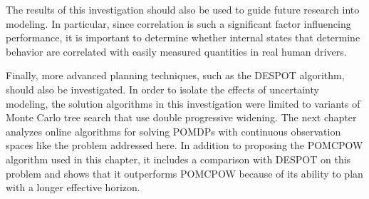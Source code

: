 The results of this investigation should also be used to guide future research into modeling.
In particular, since correlation is such a significant factor influencing performance, it is important to determine whether internal states that determine behavior are correlated with easily measured quantities in real human drivers.

Finally, more advanced planning techniques, such as the DESPOT algorithm, should also be investigated.
In order to isolate the effects of uncertainty modeling, the solution algorithms in this investigation were limited to variants of Monte Carlo tree search that use double progressive widening.
The next chapter analyzes online algorithms for solving POMDPs with continuous observation spaces like the problem addressed here.
In addition to proposing the POMCPOW algorithm used in this chapter, it includes a comparison with DESPOT on this problem and shows that it outperforms POMCPOW because of its ability to plan with a longer effective horizon.
